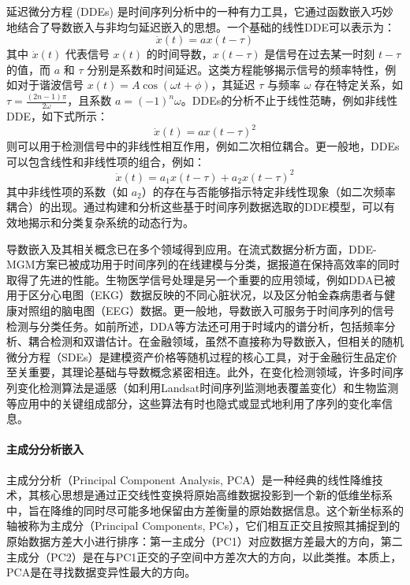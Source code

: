 延迟微分方程 (DDEs) \cite{lainscsek2015delay}是时间序列分析中的一种有力工具，它通过函数嵌入巧妙地结合了导数嵌入与非均匀延迟嵌入的思想。一个基础的线性DDE可以表示为：
\begin{equation}
    \dot{x}(t) = a x(t-\tau)
\end{equation}
其中 $\dot{x}(t)$ 代表信号 $x(t)$ 的时间导数，$x(t-\tau)$ 是信号在过去某一时刻 $t-\tau$ 的值，而 $a$ 和 $\tau$ 分别是系数和时间延迟。这类方程能够揭示信号的频率特性，例如对于谐波信号 $x(t) = A\cos(\omega t + \phi)$，其延迟 $\tau$ 与频率 $\omega$ 存在特定关系，如 $\tau = \frac{(2n-1)\pi}{2\omega}$，且系数 $a = (-1)^n\omega$。DDEs的分析不止于线性范畴，例如非线性DDE，如下式所示：
\begin{equation}
    \dot{x}(t) = a x(t-\tau)^2
\end{equation}
则可以用于检测信号中的非线性相互作用，例如二次相位耦合。更一般地，DDEs可以包含线性和非线性项的组合，例如：
\begin{equation}
    \dot{x}(t) = a_1 x(t-\tau) + a_2 x(t-\tau)^2
\end{equation}
其中非线性项的系数（如 $a_2$）的存在与否能够指示特定非线性现象（如二次频率耦合）的出现。通过构建和分析这些基于时间序列数据选取的DDE模型，可以有效地揭示和分类复杂系统的动态行为。

导数嵌入及其相关概念已在多个领域得到应用。在流式数据分析方面，DDE-MGM方案已被成功用于时间序列的在线建模与分类，据报道在保持高效率的同时取得了先进的性能。生物医学信号处理是另一个重要的应用领域，例如DDA已被用于区分心电图（EKG）数据反映的不同心脏状况，以及区分帕金森病患者与健康对照组的脑电图（EEG）数据。更一般地，导数嵌入可服务于时间序列的信号检测与分类任务。如前所述，DDA等方法还可用于时域内的谱分析，包括频率分析、耦合检测和双谱估计。在金融领域，虽然不直接称为导数嵌入，但相关的随机微分方程（SDEs）是建模资产价格等随机过程的核心工具，对于金融衍生品定价至关重要，其理论基础与导数概念紧密相连。此外，在变化检测领域，许多时间序列变化检测算法是遥感（如利用Landsat时间序列监测地表覆盖变化）和生物监测等应用中的关键组成部分，这些算法有时也隐式或显式地利用了序列的变化率信息。

\paragraph{主成分分析嵌入} %
主成分分析（Principal Component Analysis, PCA）\cite{broomhead1986extracting}是一种经典的线性降维技术，其核心思想是通过正交线性变换将原始高维数据投影到一个新的低维坐标系中，旨在降维的同时尽可能多地保留由方差衡量的原始数据信息。这个新坐标系的轴被称为主成分（Principal Components, PCs），它们相互正交且按照其捕捉到的原始数据方差大小进行排序：第一主成分（PC1）对应数据方差最大的方向，第二主成分（PC2）是在与PC1正交的子空间中方差次大的方向，以此类推。本质上，PCA是在寻找数据变异性最大的方向。

